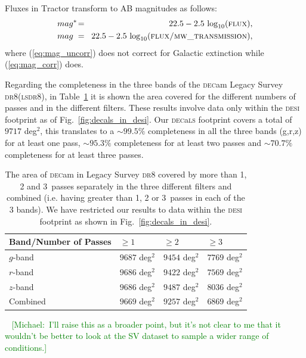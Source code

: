 \documentclass[fleqn,usenatbib]{mnras}
\newcommand{\mike}[1]{~\newline\noindent \textcolor{Green}{{ [Michael:~{#1}]\\}}}
\newcommand{\CORRFLUX}{{\textsc{flux/mw\_transmission}}\xspace}
\newcommand{\DECam}{\textsc{dec}am\xspace}
\newcommand{\DECaLS}{\textsc{dec}a\textsc{ls}\xspace}
\newcommand{\DESI}{\textsc{desi}\xspace}
\newcommand{\DReight}{\textsc{dr8}\xspace}
\newcommand{\FLUX}{{\textsc{flux}}\xspace}
\newcommand{\LS}{\textsc{ls}\xspace}
\newcommand{\TRACTOR}{\textsc{T}ractor\xspace}
\begin{document}
Fluxes in \TRACTOR transform to AB magnitudes as follows:
\begin{eqnarray}  
    mag^{*} \negthinspace &=& \negthinspace 22.5-2.5 \,\log_{10}(\FLUX) , \label{eq:mag_uncorr} \\
    mag^{\hphantom{*}}\negthinspace &=& \negthinspace 22.5 -2.5 \, \log_{10}(\CORRFLUX) , \label{eq:mag_corr}
\end{eqnarray}
where (\ref{eq:mag_uncorr}) does not correct for Galactic extinction while (\ref{eq:mag_corr}) does.



Regarding the completeness in the three bands of the \DECam Legacy Survey \DReight (\LS \DReight), in Table~\ref{tab:band_passes} it is shown the area covered for the different numbers of passes and in the different filters. These results involve data only within the \DESI footprint as of Fig.~\ref{fig:decals_in_desi}. Our \DECaLS footprint covers a total of $9717$ deg$^2$, this translates to a $\sim 99.5 \%$ completeness in all the three bands (g,r,z) for at least one pass, $\sim 95.3 \%$ completeness for at least two passes and $\sim 70.7 \%$ completeness for at least three passes.

\begin{table}
\caption{The area of \DECam in Legacy Survey \DReight  covered by more than 1, 2 and 3~passes
separately in the three different filters and combined (i.e. having greater than   
1, 2 or  3~passes in each of the 3 bands).
We have restricted our results to data within the \DESI footprint as shown in  Fig.~\ref{fig:decals_in_desi}.}
\label{tab:band_passes}
\centering
\begin{tabular}{ |p{2.9cm}||p{1.2cm}|p{1.2cm}|p{1.2cm}|  }
 \hline
 {\bf Band/Number of Passes} & $\geq 1$ & $\geq 2$ & $\geq 3$\\
 \hline
 $g$-band   & $9687$ deg$^2$ & $9454$ deg$^2$ & $7769$ deg$^2$ \\
 $r$-band   & $9686$ deg$^2$ & $9422$ deg$^2$ & $7569$ deg$^2$ \\
 $z$-band   & $9686$ deg$^2$ & $9487$ deg$^2$ & $8036$ deg$^2$ \\
 Combined & $9669$ deg$^2$ & $9257$ deg$^2$ & $6869$ deg$^2$ \\
 \hline
\end{tabular}
\end{table}

\mike{I'll raise this as a broader point, but it's not clear to me that it wouldn't be better to look at the SV dataset to sample a wider range of conditions.}
\end{document}
